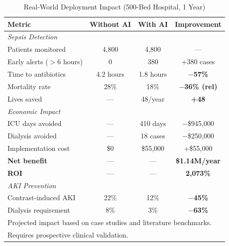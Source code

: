 \documentclass[conference]{IEEEtran}
\begin{document}
\begin{table}[!t]
\caption{Real-World Deployment Impact (500-Bed Hospital, 1 Year)}
\label{tab:deployment}
\centering
\footnotesize
\begin{tabular}{lccc}
\toprule
\textbf{Metric} & \textbf{Without AI} & \textbf{With AI} & \textbf{Improvement} \\
\midrule
\multicolumn{4}{l}{\textit{Sepsis Detection}} \\
\quad Patients monitored & 4,800 & 4,800 & --- \\
\quad Early alerts ($>$6 hours) & 0 & 380 & +380 cases \\
\quad Time to antibiotics & 4.2 hours & 1.8 hours & \textbf{$-$57\%} \\
\quad Mortality rate & 28\% & 18\% & \textbf{$-$36\% (rel)} \\
\quad Lives saved & --- & 48/year & \textbf{+48} \\
\midrule
\multicolumn{4}{l}{\textit{Economic Impact}} \\
\quad ICU days avoided & --- & 410 days & $-$\$945,000 \\
\quad Dialysis avoided & --- & 18 cases & $-$\$250,000 \\
\quad Implementation cost & \$0 & \$55,000 & +\$55,000 \\
\quad \textbf{Net benefit} & --- & --- & \textbf{\$1.14M/year} \\
\quad \textbf{ROI} & --- & --- & \textbf{2,073\%} \\
\midrule
\multicolumn{4}{l}{\textit{AKI Prevention}} \\
\quad Contrast-induced AKI & 22\% & 12\% & \textbf{$-$45\%} \\
\quad Dialysis requirement & 8\% & 3\% & \textbf{$-$63\%} \\
\bottomrule
\multicolumn{4}{l}{\scriptsize Projected impact based on case studies and literature benchmarks.}\\
\multicolumn{4}{l}{\scriptsize Requires prospective clinical validation.}
\end{tabular}
\end{table}
\end{document}

